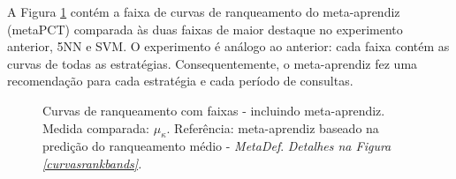 A Figura \ref{curvasrankbandsmeta} contém a faixa de curvas de ranqueamento do meta-aprendiz (metaPCT) comparada às duas faixas de maior destaque no experimento anterior, 5NN e SVM.
O experimento é análogo ao anterior: cada faixa contém as curvas de todas as estratégias.
Consequentemente, o meta-aprendiz fez uma recomendação para cada estratégia e cada período de consultas.
\begin{figure}[]
\centering
	
	\caption[Curvas de ranqueamento com faixas - incluindo meta-aprendiz.]{Curvas de ranqueamento com faixas - incluindo meta-aprendiz. Medida comparada: $\mu_{\kappa}$. Referência: meta-aprendiz baseado na predição do ranqueamento médio - \textit{MetaDef}. \textit{Detalhes na Figura \ref{curvasrankbands}.}}
	\label{curvasrankbandsmeta}
\end{figure}

